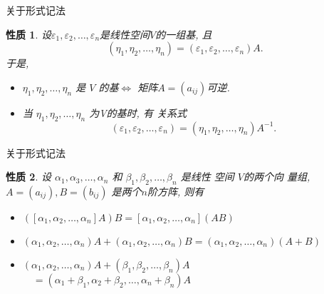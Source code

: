\documentclass[13pt]{beamer}
\newtheorem*{prop}{性质}
\begin{document}
\begin{frame}{关于形式记法}
\begin{prop}
设$\varepsilon_{1}, \varepsilon_{2}, \ldots, \varepsilon_{n}$是线性空间$V$的一组基,
且
 \[
 \left(\eta_{1}, \eta_{2}, \ldots, \eta_{n}\right)=\left(\varepsilon_{1}, \varepsilon_{2}, \ldots, \varepsilon_{n}\right) A.
 \]
于是,  
\begin{itemize}
\item $\eta_{1}, \eta_{2}, \ldots, \eta_{n}$ 是 $V$ 的基$\Leftrightarrow$  矩阵$A=(a_{ij})$可逆.
\item 当 $\eta_{1}, \eta_{2}, \ldots, \eta_{n}$ 为V的基时, 有 关系式
\[
\left(\varepsilon_{1}, \varepsilon_{2}, \ldots, \varepsilon_{n}\right)=\left(\eta_{1}, \eta_{2}, \ldots, \eta_{n}\right) A^{-1}.
\]
\end{itemize}
\end{prop}
\end{frame}



\begin{frame}{关于形式记法}
\begin{prop}
设 $\alpha_{1}, \alpha_{3}, \dots, \alpha_{n}$ 和 $\beta_{{1}}, \beta_{2}, \dots, \beta_{n}$ 是线性
空间 $V$的两个向 量组, $A=\left(a_{i j}\right), B=\left(b_{i j}\right)$
是两个$n$阶方阵, 则有 
\begin{itemize}
\item $\left(\left[\alpha_{1}, \alpha_{2}, \ldots, \alpha_{n}\right] A\right) B=\left[\alpha_{1}, \alpha_{2}, \ldots, \alpha_{n}\right](A B)$
\item $\left(\alpha_{1}, \alpha_{2}, \ldots, \alpha_{n}\right) A+\left(\alpha_{1}, \alpha_{2}, \ldots, \alpha_{n}\right) B=\left(\alpha_{1}, \alpha_{2}, \ldots, \alpha_{n}\right)(A+B)$
\item $\left(\alpha_{1}, \alpha_{2}, \ldots, \alpha_{n}\right) A+\left(\beta_{1}, \beta_{2}, \ldots, \beta_{n}\right) A$\\ $\quad = \left(\alpha_{1}+\beta_{1}, \alpha_{2}+\beta_{2}, \ldots, \alpha_{n}+\beta_{n}\right) A$
\end{itemize}
\end{prop}
\end{frame}
\end{document}
